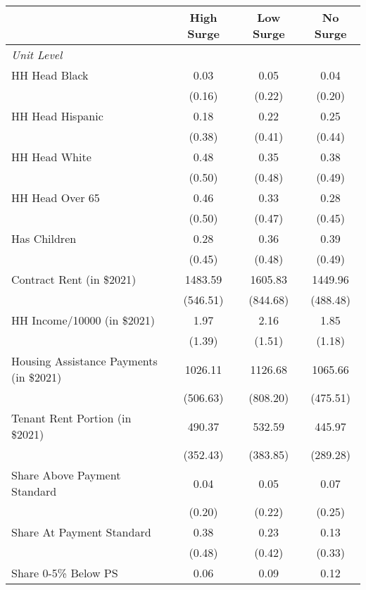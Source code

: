 \begin{tabular}{l*{3}{c}}
\toprule
                &High Surge&Low Surge& No Surge\\
\midrule
\emph{Unit Level}&         &         &         \\
\addlinespace
HH Head Black      &     0.03&     0.05&     0.04\\
                &   (0.16)&   (0.22)&   (0.20)\\
\addlinespace
HH Head Hispanic    &     0.18&     0.22&     0.25\\
                &   (0.38)&   (0.41)&   (0.44)\\
\addlinespace
HH Head White      &     0.48&     0.35&     0.38\\
                &   (0.50)&   (0.48)&   (0.49)\\
\addlinespace
HH Head Over 65     &     0.46&     0.33&     0.28\\
                &   (0.50)&   (0.47)&   (0.45)\\
\addlinespace
Has Children  &     0.28&     0.36&     0.39\\
                &   (0.45)&   (0.48)&   (0.49)\\
\addlinespace
Contract Rent (in \$2021) &  1483.59&  1605.83&  1449.96\\
                & (546.51)& (844.68)& (488.48)\\
\addlinespace
HH Income/10000 (in \$2021)        &     1.97&     2.16&     1.85\\
                &   (1.39)&   (1.51)&   (1.18)\\
\addlinespace
Housing Assistance Payments (in \$2021)        &  1026.11&  1126.68&  1065.66\\
                & (506.63)& (808.20)& (475.51)\\
\addlinespace
Tenant Rent Portion (in \$2021)        &   490.37&   532.59&   445.97\\
                & (352.43)& (383.85)& (289.28)\\
\addlinespace
Share Above Payment Standard          &     0.04&     0.05&     0.07\\
                &   (0.20)&   (0.22)&   (0.25)\\
\addlinespace
Share At Payment Standard          &     0.38&     0.23&     0.13\\
                &   (0.48)&   (0.42)&   (0.33)\\
\addlinespace
Share 0-5\% Below PS       &     0.06&     0.09&     0.12\\

\end{tabular}
